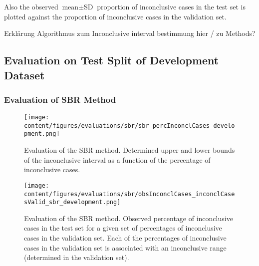 Also the observed $\text{mean} \pm \text{SD}$ proportion of inconclusive cases in the test set is plotted 
against the proportion of inconclusive cases in the validation set.


Erklärung Algorithmus zum Inconclusive interval bestimmung hier / zu Methods? 




\subsection{Evaluation on Test Split of Development Dataset}
\label{subsec:eval_dev}


\subsubsection{Evaluation of SBR Method}
\label{subsubsec:eval_sbr}


\begin{figure}[t]
    \centering
    \texttt{[image: content/figures/evaluations/sbr/sbr\_percInconclCases\_development.png]}
    \caption{Evaluation of the SBR method. Determined upper and lower bounds of the inconclusive interval 
    as a function of the percentage of inconclusive cases.} 
    \label{fig:sbr_percInconclCases_development}
\end{figure} 


\begin{figure}[h]
    \centering
    \texttt{[image: content/figures/evaluations/sbr/obsInconclCases\_inconclCasesValid\_sbr\_development.png]}
    \caption{Evaluation of the SBR method. Observed percentage of inconclusive cases in the test set 
    for a given set of percentages of inconclusive cases in the validation set.
    Each of the percentages of inconclusive cases in the validation set is associated 
    with an inconclusive range (determined in the validation set).} 
    \label{fig:obsInconclCases_inconclCasesValid_sbr_development}
\end{figure} 


